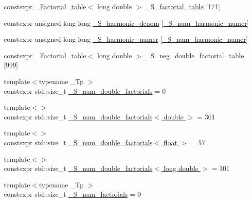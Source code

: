 \begin{DoxyCompactItemize}
\item 
constexpr \hyperlink{structstd_1_1____detail_1_1__Factorial__table}{\+\_\+\+Factorial\+\_\+table}$<$ long double $>$ \hyperlink{namespacestd_1_1____detail_a008b54abe31c1027aefdfd7a76a40e99}{\+\_\+\+S\+\_\+factorial\+\_\+table} \mbox{[}171\mbox{]}
\item 
constexpr unsigned long long \hyperlink{namespacestd_1_1____detail_ad2bdb66d93fa4433097b287c7899cd1e}{\+\_\+\+S\+\_\+harmonic\+\_\+denom} \mbox{[}\hyperlink{namespacestd_1_1____detail_a554788747841f6abbfd7572673df32ad}{\+\_\+\+S\+\_\+num\+\_\+harmonic\+\_\+numer}\mbox{]}
\item 
constexpr unsigned long long \hyperlink{namespacestd_1_1____detail_a3976bb1731d7ecfaba4601d1083d7cf6}{\+\_\+\+S\+\_\+harmonic\+\_\+numer} \mbox{[}\hyperlink{namespacestd_1_1____detail_a554788747841f6abbfd7572673df32ad}{\+\_\+\+S\+\_\+num\+\_\+harmonic\+\_\+numer}\mbox{]}
\item 
constexpr \hyperlink{structstd_1_1____detail_1_1__Factorial__table}{\+\_\+\+Factorial\+\_\+table}$<$ long double $>$ \hyperlink{namespacestd_1_1____detail_adb3fbe0d6f7c40b02e479b63d547f57c}{\+\_\+\+S\+\_\+neg\+\_\+double\+\_\+factorial\+\_\+table} \mbox{[}999\mbox{]}
\item 
{\footnotesize template$<$typename \+\_\+\+Tp $>$ }\\constexpr std\+::size\+\_\+t \hyperlink{namespacestd_1_1____detail_a762f5ed905d1f926bfd8b16f8ea2c568}{\+\_\+\+S\+\_\+num\+\_\+double\+\_\+factorials} = 0
\item 
{\footnotesize template$<$$>$ }\\constexpr std\+::size\+\_\+t \hyperlink{namespacestd_1_1____detail_ae829eb6434a90060ee0650f1c71fb92d}{\+\_\+\+S\+\_\+num\+\_\+double\+\_\+factorials$<$ double $>$} = 301
\item 
{\footnotesize template$<$$>$ }\\constexpr std\+::size\+\_\+t \hyperlink{namespacestd_1_1____detail_ac55fdd5d901fcd9335503b16ec897444}{\+\_\+\+S\+\_\+num\+\_\+double\+\_\+factorials$<$ float $>$} = 57
\item 
{\footnotesize template$<$$>$ }\\constexpr std\+::size\+\_\+t \hyperlink{namespacestd_1_1____detail_a46272d8c219cfca2054da99471ed3711}{\+\_\+\+S\+\_\+num\+\_\+double\+\_\+factorials$<$ long double $>$} = 301
\item 
{\footnotesize template$<$typename \+\_\+\+Tp $>$ }\\constexpr std\+::size\+\_\+t \hyperlink{namespacestd_1_1____detail_a671f3ba94c1b06be87992486bca37426}{\+\_\+\+S\+\_\+num\+\_\+factorials} = 0

\end{DoxyCompactItemize}
